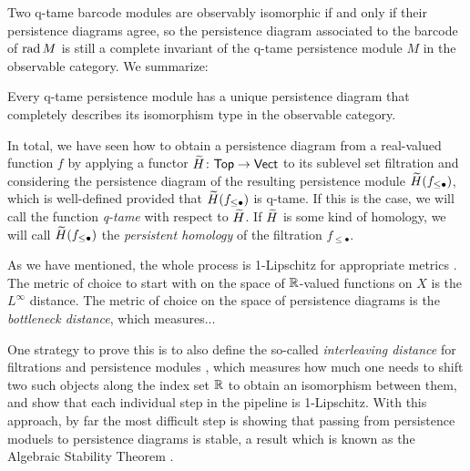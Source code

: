 Two q-tame barcode modules are observably isomorphic if and only if their persistence diagrams agree, so the persistence diagram associated to the barcode of $\operatorname{rad} M$ is still a complete invariant of the q-tame persistence module $M$ in the observable category.
We summarize:

\begin{thm} \label{thm:q-tame modules have barcodes}
Every q-tame persistence module has a unique persistence diagram that completely describes its isomorphism type in the observable category.
\end{thm}

In total, we have seen how to obtain a persistence diagram from a real-valued function $f$ by applying a functor $\widetilde{H} \colon \mathsf{Top} \to \mathsf{Vect}$ to its sublevel set filtration and considering the persistence diagram of the resulting persistence module $\widetilde{H}(f_{\leq \bullet})$, which is well-defined provided that $\widetilde{H}(f_{\leq \bullet})$ is q-tame. If this is the case, we will call the function \emph{q-tame} with respect to $\widetilde{H}$. If $\widetilde{H}$ is some kind of homology, we will call $\widetilde{H}(f_{\leq \bullet})$ the \emph{persistent homology} of the filtration $f_{\leq \bullet}$.

As we have mentioned, the whole process is 1-Lipschitz for appropriate metrics \cite{MR3333456}. The metric of choice to start with on the space of $\mathbb{R}$-valued functions on $X$ is the $L^{\infty}$ distance. The metric of choice on the space of persistence diagrams is the \emph{bottleneck distance}, which measures... 

One strategy to prove this is to also define the so-called \emph{interleaving distance} for filtrations and persistence modules \cite{MR2279866}, which measures how much one needs to shift two such objects along the index set $\mathbb{R}$ to obtain an isomorphism between them, and show that each individual step in the pipeline is 1-Lipschitz. With this approach, by far the most difficult step is showing that passing from persistence moduels to persistence diagrams is stable, a result which is known as the Algebraic Stability Theorem  \cite{10.1145/1542362.1542407,Chazal.2016a,MR3348168}.
